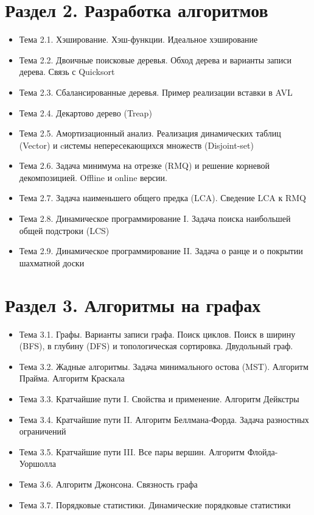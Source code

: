 \documentclass[a4paper,11pt]{article}
\begin{document}
\section*{Раздел 2. Разработка алгоритмов}
\begin{itemize}
\item Тема 2.1. Хэширование. Хэш-функции. Идеальное хэширование
\item Тема 2.2. Двоичные поисковые деревья. Обход дерева и варианты записи дерева. Связь с Quicksort
\item Тема 2.3. Сбалансированные деревья. Пример реализации вставки в AVL
\item Тема 2.4. Декартово дерево (Treap)
\item Тема 2.5. Амортизационный анализ. Реализация динамических таблиц (Vector) и cистемы непересекающихся множеств (Disjoint-set)
\item Тема 2.6. Задача минимума на отрезке (RMQ) и решение корневой декомпозицией. Offline и online версии.
\item Тема 2.7. Задача наименьшего общего предка (LCA). Сведение LCA к RMQ
\item Тема 2.8. Динамическое программирование I. Задача поиска наибольшей общей подстроки (LCS)
\item Тема 2.9. Динамическое программирование II. Задача о ранце и о покрытии шахматной доски
\end{itemize}
\section*{Раздел 3. Алгоритмы на графах}
\begin{itemize}
\item Тема 3.1. Графы. Варианты записи графа. Поиск циклов. Поиск в ширину (BFS), в глубину (DFS) и топологическая сортировка. Двудольный граф.
\item Тема 3.2. Жадные алгоритмы. Задача минимального остова (MST). Алгоритм Прайма. Алгоритм Краскала
\item Тема 3.3. Кратчайшие пути I. Свойства и применение. Алгоритм Дейкстры
\item Тема 3.4. Кратчайшие пути II. Алгоритм Беллмана-Форда. Задача разностных ограничений
\item Тема 3.5. Кратчайшие пути III. Все пары вершин. Алгоритм Флойда-Уоршолла
\item Тема 3.6. Алгоритм Джонсона. Связность графа
\item Тема 3.7. Порядковые статистики. Динамические порядковые статистики
\end{itemize}
\end{document}
